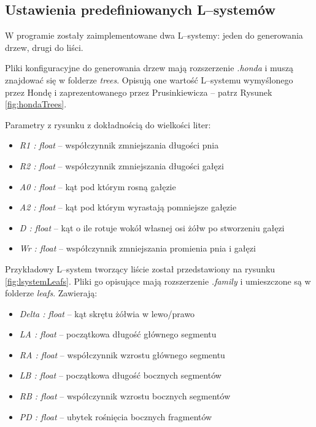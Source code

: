 \documentclass[inz,longabstract]{iithesis}
\begin{document}
        \subsection{Ustawienia predefiniowanych L--systemów}
        W programie zostały zaimplementowane dwa L--systemy: jeden do generowania drzew, drugi do liści.
        
        Pliki konfiguracyjne do generowania drzew mają rozszerzenie \textit{.honda} i muszą znajdować się w folderze \textit{trees}. Opisują one wartość L--systemu wymyślonego przez Hondę \cite{honda} i zaprezentowanego przez Prusinkiewicza \cite{plants} -- patrz Rysunek \ref{fig:hondaTrees}.
        
        Parametry z rysunku z dokładnością do wielkości liter:
        \begin{itemize}
            \item \textit{R1 : float} -- współczynnik zmniejszania długości pnia
            \item \textit{R2 : float} -- współczynnik zmniejszania długości gałęzi
            \item \textit{A0 : float} -- kąt pod którym rosną gałęzie
            \item \textit{A2 : float} -- kąt pod którym wyrastają pomniejsze gałęzie
            \item \textit{D : float} -- kąt o ile rotuje wokół własnej osi żółw po stworzeniu gałęzi
            \item \textit{Wr : float} -- współczynnik zmniejszania promienia pnia i gałęzi
        \end{itemize}    
        
        Przykładowy L--system tworzący liście został przedstawiony na rysunku \ref{fig:lsystemLeafs}. Pliki go opisujące mają rozszerzenie \textit{.family} i umieszczone są w folderze \textit{leafs}. Zawierają:
        \begin{itemize}
            \item \textit{Delta : float} -- kąt skrętu żółwia w lewo/prawo
            \item \textit{LA : float} -- początkowa długość głównego segmentu
            \item \textit{RA : float} -- współczynnik wzrostu głównego segmentu
            \item \textit{LB : float} -- początkowa długość bocznych segmentów
            \item \textit{RB : float} -- współczynnik wzrostu bocznych segmentów
            \item \textit{PD : float} -- ubytek rośnięcia bocznych fragmentów
        \end{itemize}    
        
\end{document}
